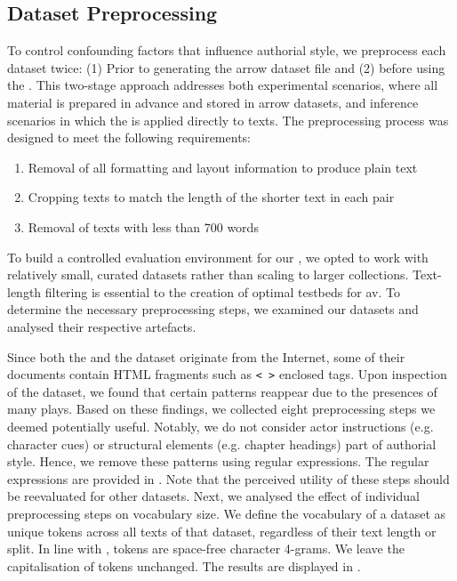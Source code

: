 \subsection{Dataset Preprocessing}
\label{subsec:dataset_preprocessing}

To control confounding factors that influence authorial style, we preprocess each dataset twice:
(1) Prior to generating the arrow dataset file and (2) before using the \impAppr{}.
This two-stage approach addresses both experimental scenarios, where all material is prepared in advance and stored in arrow datasets, and inference scenarios in which the \impAppr{} is applied directly to texts.
The preprocessing process was designed to meet the following requirements:
\begin{enumerate}
    \item Removal of all formatting and layout information to produce plain text
    \item Cropping texts to match the length of the shorter text in each pair
    \item Removal of texts with less than 700 words
\end{enumerate}
To build a controlled evaluation environment for our \impAppr{}, we opted to work with relatively small, curated datasets rather than scaling to larger collections.  
Text-length filtering is essential to the creation of optimal testbeds for \ac{av}.
To determine the necessary preprocessing steps, we examined our datasets and analysed their respective artefacts.

Since both the \dataBlog{} and the \dataPan{} dataset originate from the Internet, some of their documents contain HTML fragments such as \texttt{< >} enclosed tags.
Upon inspection of the \dataGutenberg{} dataset, we found that certain patterns reappear due to the presences of many plays.
Based on these findings, we collected eight preprocessing steps we deemed potentially useful. 
Notably, we do not consider actor instructions (e.g. character cues) or structural elements (e.g. chapter headings) part of authorial style.
Hence, we remove these patterns using regular expressions.
The regular expressions are provided in .
Note that the perceived utility of these steps should be reevaluated for other datasets.
Next, we analysed the effect of individual preprocessing steps on vocabulary size.  
We define the vocabulary of a dataset as unique tokens across all texts of that dataset, regardless of their text length or split.
In line with \citep{koppel_determining_2014}, tokens are space-free character 4-grams.
We leave the capitalisation of tokens unchanged. 
The results are displayed in .

